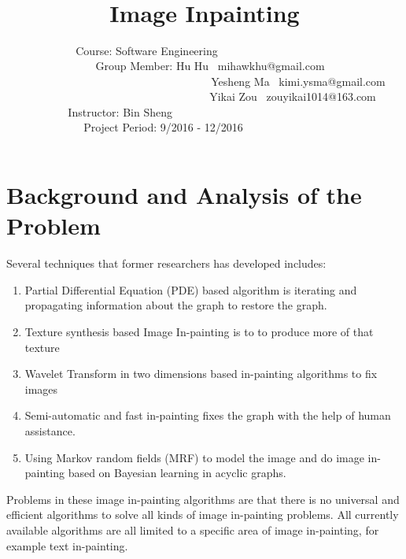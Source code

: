 \documentclass[12pt]{article}
\begin{document}
\title{\huge\textbf{\ \\ \ \\Image Inpainting}\vspace{11cm}}
\author{	
	\large
	Course: Software Engineering\ \ \ \ \ \ \  \ \  \  \  \ \ \ \ \ \  \ \ \ \ \\
	\ \ \ \ \ \ \ \ \ \ \ Group Member: Hu Hu \ mihawkhu@gmail.com\ \ \ \ \ \ \ \ \ \\
	\ \ \ \ \ \ \ \ \  \ \ \ \ \ \ \ \ \ \ \ \ \ \ \ \ \ \ \ \ \ \ \ \ \ Yesheng Ma \ kimi.ysma@gmail.com \\
	\ \ \ \ \ \ \ \ \  \ \ \ \ \ \ \ \ \ \ \ \ \ \ \ \ \ \ \ \ \ \   \ Yikai Zou \ zouyikai1014@163.com\\
	Instructor: Bin Sheng \ \ \ \ \ \ \ \  \ \ \ \ \ \ \ \ \ \ \ \ \ \ \  \ \ \ \ \ \ \ \\
	Project Period: 9/2016 - 12/2016\ \ \ \ \  \ \ \ \ \ \ \ \ \ \ 	
	} \date{ }

\maketitle\thispagestyle{empty}
\newpage
\tableofcontents\thispagestyle{empty}
\newpage




\section{Background and Analysis of the Problem}
Several techniques that former researchers has developed includes:
\begin{enumerate}[1.]
	\item Partial Differential Equation (PDE) based algorithm is iterating and propagating information about the graph to restore the graph.
	\item Texture synthesis based Image In-painting is to to produce more of that texture
	\item Wavelet Transform in two dimensions based in-painting algorithms to fix images
	\item Semi-automatic and fast in-painting fixes the graph with the help of human assistance.
	\item Using Markov random fields (MRF) to model the image and do image in-painting based on Bayesian learning in acyclic graphs.
\end{enumerate}
Problems in these image in-painting algorithms are that there is no universal and 
efficient algorithms to solve all kinds of image in-painting problems.
All currently available algorithms are all limited to a specific area of image
in-painting, for example text in-painting.
\end{document}
